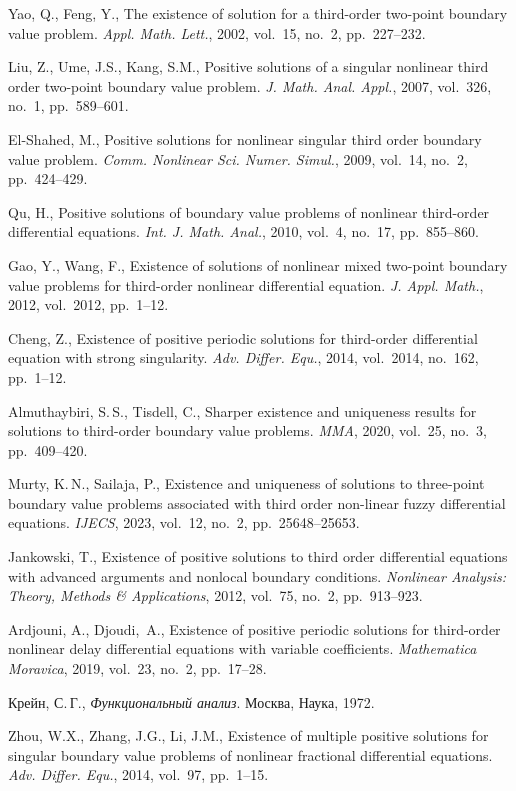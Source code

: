 \documentclass[press]{vestnik}
\begin{document}
\begin{thebibliography}{99}
Yao, Q., Feng, Y., The existence of solution for a third-order two-point boundary value problem. \emph{Appl. Math. Lett.}, 2002, vol.~15, no.~2, pp.~227--232. 

Liu, Z., Ume, J.S., Kang, S.M., Positive solutions of a singular nonlinear third order two-point boundary value problem. \emph{J. Math. Anal. Appl.}, 2007, vol.~326, no.~1, pp.~589--601. 

El-Shahed, M., Positive solutions for nonlinear singular third order boundary value problem. \emph{Comm. Nonlinear Sci. Numer. Simul.}, 2009, vol.~14, no.~2, pp.~424--429. 

Qu, H., Positive solutions of boundary value problems of nonlinear third-order differential equations. \emph{Int. J. Math. Anal.}, 2010, vol.~4, no.~17, pp.~855--860.

Gao, Y., Wang, F., Existence of solutions of nonlinear mixed two-point boundary value problems for third-order nonlinear differential equation. \emph{J. Appl. Math.}, 2012, vol.~2012, pp.~1--12. 

Cheng, Z., Existence of positive periodic solutions for third-order differential equation with strong singularity. \emph{Adv. Differ. Equ.}, 2014, vol.~2014, no.~162, pp.~1--12. 

Almuthaybiri, S.\,S., Tisdell, C., Sharper existence and uniqueness results for solutions to third-order boundary value problems. \emph{MMA}, 2020, vol.~25, no.~3, pp.~409--420. 

Murty, K.\,N., Sailaja, P., Existence and uniqueness of solutions to three-point boundary value problems associated with third order non-linear fuzzy differential equations. \emph{IJECS}, 2023, vol.~12, no.~2, pp.~25648--25653. 

Jankowski, T., Existence of positive solutions to third order differential equations with advanced arguments and nonlocal boundary conditions. \emph{Nonlinear Analysis: Theory, Methods \& Applications}, 2012, vol.~75, no.~2, pp.~913--923. 

Ardjouni, A., Djoudi,~A., Existence of positive periodic solutions for third-order nonlinear delay differential equations with variable coefficients. \emph{Mathematica Moravica}, 2019, vol.~23, no.~2, pp.~17--28. 

Крейн, С.\,Г., \emph{Функциональный анализ}. Москва, Наука, 1972. 

Zhou, W.X., Zhang, J.G., Li, J.M., Existence of multiple positive solutions for singular boundary value problems of nonlinear fractional differential equations. \emph{Adv. Differ. Equ.}, 2014, vol.~97, pp.~1--15. 
\end{thebibliography}
\end{document}

